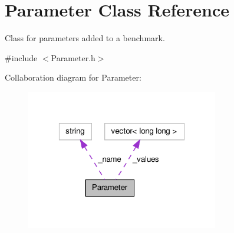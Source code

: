 \hypertarget{classParameter}{\section{Parameter Class Reference}
\label{classParameter}
}


Class for parameters added to a benchmark.  




{\ttfamily \#include $<$Parameter.\-h$>$}



Collaboration diagram for Parameter\-:\nopagebreak
\begin{figure}[H]
\begin{center}
\leavevmode
\includegraphics[width=238pt]{classParameter__coll__graph}
\end{center}
\end{figure}
